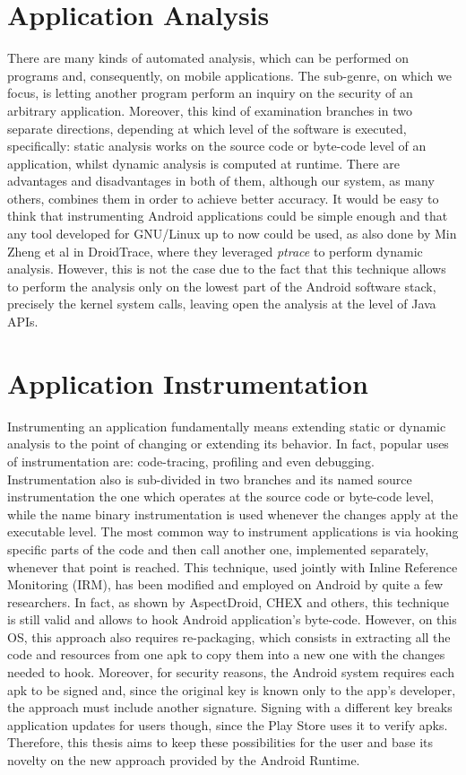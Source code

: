 \section{Application Analysis}
There are many kinds of automated analysis, which can be performed on programs and, consequently, on mobile applications. The sub-genre, on which we focus, is letting another program perform an inquiry on the security of an arbitrary application. Moreover, this kind of examination branches in two separate directions, depending at which level of the software is executed, specifically: static analysis works on the source code or byte-code level of an application, whilst dynamic analysis is computed at runtime. There are advantages and disadvantages in both of them, although our system, as many others, combines them in order to achieve better accuracy.
It would be easy to think that instrumenting Android applications could be simple enough and that any tool developed for GNU/Linux up to now could be used, as also done by Min Zheng et al in DroidTrace\cite{droidtrace}, where they leveraged \emph{ptrace} to perform dynamic analysis. However, this is not the case due to the fact that this technique allows to perform the analysis only on the lowest part of the Android software stack, precisely the kernel system calls, leaving open the analysis at the level of Java APIs. 

\section{Application Instrumentation}
Instrumenting an application fundamentally means extending static or dynamic analysis to the point of changing or extending its behavior. In fact, popular uses of instrumentation are: code-tracing, profiling and even debugging. Instrumentation also is sub-divided in two branches and its named source instrumentation the one which operates at the source code or byte-code level, while the name binary instrumentation is used whenever the changes apply at the executable level. The most common way to instrument applications is via hooking specific parts of the code and then call another one, implemented separately, whenever that point is reached. This technique, used jointly with Inline Reference Monitoring (IRM)\cite{irm}, has been modified and employed on Android by quite a few researchers. In fact, as shown by AspectDroid\cite{AspectDroid}, CHEX\cite{chex} and others, this technique is still valid and allows to hook Android application's byte-code. However, on this OS, this approach also requires re-packaging, which consists in extracting all the code and resources from one apk to copy them into a new one with the changes needed to hook. Moreover, for security reasons, the Android system requires each apk to be signed and, since the original key is known only to the app's developer, the approach must include another signature. Signing with a different key breaks application updates for users though, since the Play Store uses it to verify apks. Therefore, this thesis aims to keep these possibilities for the user and base its novelty on the new approach provided by the Android Runtime.


